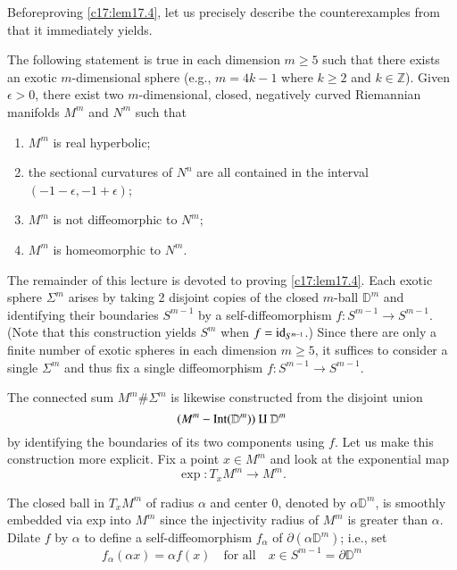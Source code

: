 Before\pageoriginale proving \ref{c17:lem17.4}, let us precisely
describe the counterexamples from \cite{39} that it immediately
yields.

\begin{thm}\label{c17:thm17.5}
The following statement is true in each dimension $m\geq 5$ such that
there exists an exotic $m$-dimensional sphere (e.g., $m=4k-1$ where
$k\geq 2$ and $k\in \mathbb{Z}$). Given $\epsilon>0$, there exist two
$m$-dimensional, closed, negatively curved Riemannian manifolds
$M^{m}$ and $N^{m}$ such that
\begin{enumerate}
\item $M^{m}$ is real hyperbolic;

\item the sectional curvatures of $N^{n}$ are all contained in the
  interval $(-1-\epsilon,-1+\epsilon)$;

\item $M^{m}$ is not diffeomorphic to $N^{m}$;

\item $M^{m}$ is homeomorphic to $N^{m}$.
\end{enumerate}
\end{thm}

The remainder of this lecture is devoted to proving
\ref{c17:lem17.4}. Each exotic sphere $\Sigma^{m}$ arises by taking 2
disjoint copies of the closed $m$-ball $\mathbb{D}^{m}$ and
identifying their boundaries $S^{m-1}$ by a self-diffeomorphism
$f:S^{m-1}\to S^{m-1}$. (Note that this construction yields $S^{m}$ when
  $f=\operatorname{id}_{S^{m-1}}$.) Since there are only a finite number of exotic
  spheres in each dimension $m\geq 5$, it suffices to consider a
  single $\Sigma^{m}$ and thus fix a single diffeomorphism
  $f:S^{m-1}\to S^{m-1}$.

The connected sum $M^{m}\# \Sigma^{m}$ is likewise constructed from
the disjoint union
$$
(M^{m}-\operatorname{Int}(\mathbb{D}^{m}))\amalg \mathbb{D}^{m}
$$
by identifying the boundaries of its two components using $f$. Let us
make this construction more explicit. Fix a point $x\in M^{m}$ and
look at the exponential map 
$$
\exp :T_{x}M^{m}\to M^{m}.
$$

The closed ball in $T_{x}M^{m}$ of radius $\alpha$ and center $0$,
denoted by $\alpha\mathbb{D}^{m}$, is smoothly embedded via exp into
$M^{m}$ since the injectivity radius of $M^{m}$ is greater than
$\alpha$. Dilate $f$ by $\alpha$ to define a self-diffeomorphism
$f_{\alpha}$ of $\partial(\alpha\mathbb{D}^{m})$; i.e., set
$$
f_{\alpha}(\alpha x)=\alpha f(x)\quad\text{for all}\quad x\in
  S^{m-1}=\partial \mathbb{D}^{m}
$$

